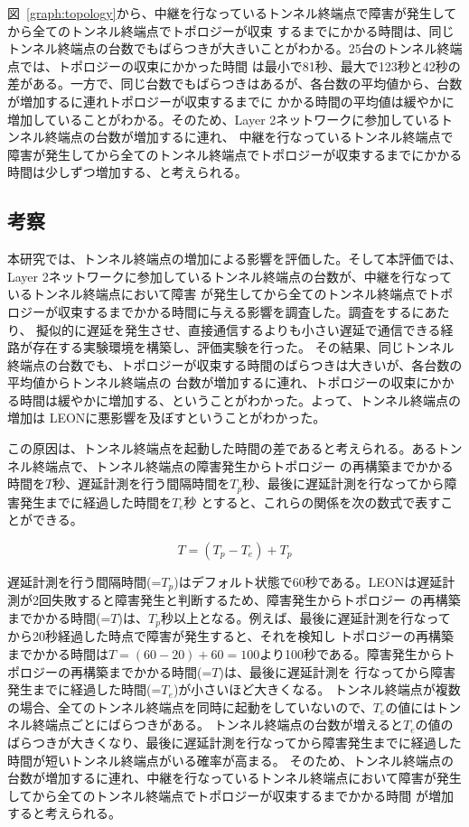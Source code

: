 図~\ref{graph:topology}から、中継を行なっているトンネル終端点で障害が発生してから全てのトンネル終端点でトポロジーが収束
するまでにかかる時間は、同じトンネル終端点の台数でもばらつきが大きいことがわかる。25台のトンネル終端点では、トポロジーの収束にかかった時間
は最小で81秒、最大で123秒と42秒の差がある。一方で、同じ台数でもばらつきはあるが、各台数の平均値から、台数が増加するに連れトポロジーが収束するまでに
かかる時間の平均値は緩やかに増加していることがわかる。そのため、Layer 2ネットワークに参加しているトンネル終端点の台数が増加するに連れ、
中継を行なっているトンネル終端点で障害が発生してから全てのトンネル終端点でトポロジーが収束するまでにかかる時間は少しずつ増加する、と考えられる。

\subsection{考察}

本研究では、トンネル終端点の増加による影響を評価した。そして本評価では、Layer 2ネットワークに参加しているトンネル終端点の台数が、中継を行なっているトンネル終端点において障害
が発生してから全てのトンネル終端点でトポロジーが収束するまでかかる時間に与える影響を調査した。調査をするにあたり、
擬似的に遅延を発生させ、直接通信するよりも小さい遅延で通信できる経路が存在する実験環境を構築し、評価実験を行った。
その結果、同じトンネル終端点の台数でも、トポロジーが収束する時間のばらつきは大きいが、各台数の平均値からトンネル終端点の
台数が増加するに連れ、トポロジーの収束にかかる時間は緩やかに増加する、ということがわかった。よって、トンネル終端点の増加は
LEONに悪影響を及ぼすということがわかった。

この原因は、トンネル終端点を起動した時間の差であると考えられる。あるトンネル終端点で、トンネル終端点の障害発生からトポロジー
の再構築までかかる時間を$ T $秒、遅延計測を行う間隔時間を$ T_p $秒、最後に遅延計測を行なってから障害発生までに経過した時間を$ T_e $秒
とすると、これらの関係を次の数式で表すことができる。

\begin{displaymath}
\displaystyle T = (T_p - T_e) + T_p
\end{displaymath}

遅延計測を行う間隔時間(=$ T_p $)はデフォルト状態で60秒である。LEONは遅延計測が2回失敗すると障害発生と判断するため、障害発生からトポロジー
の再構築までかかる時間(=$ T $)は、$ T_p $秒以上となる。例えば、最後に遅延計測を行なってから20秒経過した時点で障害が発生すると、それを検知し
トポロジーの再構築までかかる時間は$ T = (60 - 20) + 60 = 100 $より100秒である。障害発生からトポロジーの再構築までかかる時間(=$ T $)は、最後に遅延計測を
行なってから障害発生までに経過した時間(=$ T_e $)が小さいほど大きくなる。
トンネル終端点が複数の場合、全てのトンネル終端点を同時に起動をしていないので、$ T_e $の値にはトンネル終端点ごとにばらつきがある。
トンネル終端点の台数が増えると$ T_e $の値のばらつきが大きくなり、最後に遅延計測を行なってから障害発生までに経過した時間が短いトンネル終端点がいる確率が高まる。
そのため、トンネル終端点の台数が増加するに連れ、中継を行なっているトンネル終端点において障害が発生してから全てのトンネル終端点でトポロジーが収束するまでかかる時間
が増加すると考えられる。

